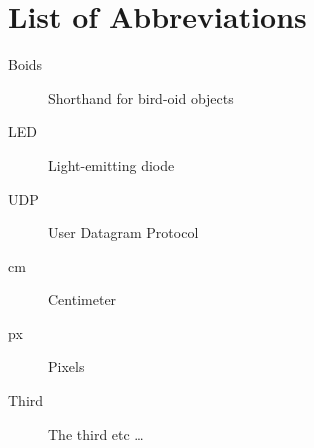 \chapter*{List of Abbreviations}

\begin{description}
  \item[Boids] Shorthand for bird-oid objects
  \item[LED] Light-emitting diode
  \item[UDP] User Datagram Protocol
  \item[cm] Centimeter
  \item [px] Pixels
  \item[Third] The third etc \ldots
\end{description}
